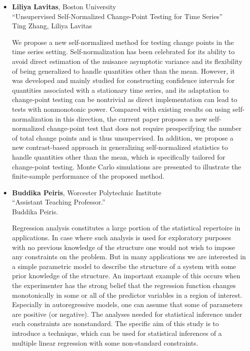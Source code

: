 \begin{itemize}
\item \textbf{Liliya Lavitas}, Boston University \\
``Unsupervised Self-Normalized Change-Point Testing for Time Series'' \\
Ting Zhang, Liliya Lavitas


We propose a new self-normalized method for testing change points in the time series setting. Self-normalization has been celebrated for its ability to avoid direct estimation of the nuisance asymptotic variance and its flexibility of being generalized to handle quantities other than the mean. However, it was developed and mainly studied for constructing confidence intervals for quantities associated with a stationary time series, and its adaptation to change-point testing can be nontrivial as direct implementation can lead to tests with nonmonotonic power. Compared with existing results on using self-normalization in this direction, the current paper proposes a new self-normalized change-point test that does not require prespecifying the number of total change points and is thus unsupervised. In addition, we propose a new contrast-based approach in generalizing self-normalized statistics to handle quantities other than the mean, which is specifically tailored for change-point testing. Monte Carlo simulations are presented to illustrate the finite-sample performance of the proposed method.

\item \textbf{Buddika Peiris}, Worcester Polytechnic Institute \\
``Assistant Teaching Professor.'' \\
Buddika Peiris.


Regression analysis constitutes a large portion of the statistical repertoire in applications. In case
where such analysis is used for exploratory purposes with no previous knowledge of the structure
one would not wish to impose any constraints on the problem. But in many applications we are
interested in a simple parametric model to describe the structure of a system with some prior
knowledge of the structure. An important example of this occurs when the experimenter has the
strong belief that the regression function changes monotonically in some or all of the predictor
variables in a region of interest. Especially in autoregressive models, one can assume that some of
parameters are positive (or negative). The analyses needed for statistical inference under such
constraints are nonstandard. The specific aim of this study is to introduce a technique, which can
be used for statistical inferences of a multiple linear regression with some non-standard constraints.

\end{itemize}

